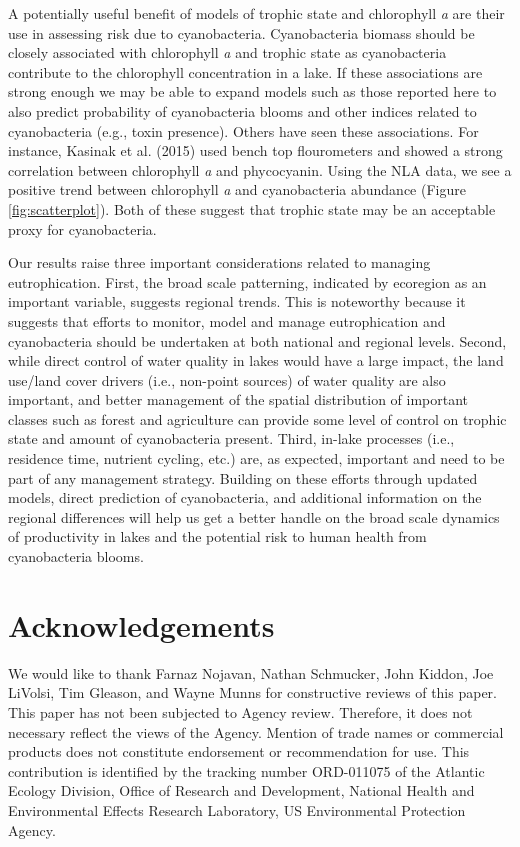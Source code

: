 \documentclass[12pt,]{article}
\begin{document}
A potentially useful benefit of models of trophic state and chlorophyll
\emph{a} are their use in assessing risk due to cyanobacteria.
Cyanobacteria biomass should be closely associated with chlorophyll
\emph{a} and trophic state as cyanobacteria contribute to the
chlorophyll concentration in a lake. If these associations are strong
enough we may be able to expand models such as those reported here to
also predict probability of cyanobacteria blooms and other indices
related to cyanobacteria (e.g., toxin presence). Others have seen these
associations. For instance, Kasinak et al. (2015) used bench top
flourometers and showed a strong correlation between chlorophyll
\emph{a} and phycocyanin. Using the NLA data, we see a positive trend
between chlorophyll \emph{a} and cyanobacteria abundance (Figure
\ref{fig:scatterplot}). Both of these suggest that trophic state may be
an acceptable proxy for cyanobacteria.

Our results raise three important considerations related to managing
eutrophication. First, the broad scale patterning, indicated by
ecoregion as an important variable, suggests regional trends. This is
noteworthy because it suggests that efforts to monitor, model and manage
eutrophication and cyanobacteria should be undertaken at both national
and regional levels. Second, while direct control of water quality in
lakes would have a large impact, the land use/land cover drivers (i.e.,
non-point sources) of water quality are also important, and better
management of the spatial distribution of important classes such as
forest and agriculture can provide some level of control on trophic
state and amount of cyanobacteria present. Third, in-lake processes
(i.e., residence time, nutrient cycling, etc.) are, as expected,
important and need to be part of any management strategy. Building on
these efforts through updated models, direct prediction of
cyanobacteria, and additional information on the regional differences
will help us get a better handle on the broad scale dynamics of
productivity in lakes and the potential risk to human health from
cyanobacteria blooms.

\section{Acknowledgements}\label{acknowledgements}

We would like to thank Farnaz Nojavan, Nathan Schmucker, John Kiddon,
Joe LiVolsi, Tim Gleason, and Wayne Munns for constructive reviews of
this paper. This paper has not been subjected to Agency review.
Therefore, it does not necessary reflect the views of the Agency.
Mention of trade names or commercial products does not constitute
endorsement or recommendation for use. This contribution is identified
by the tracking number ORD-011075 of the Atlantic Ecology Division,
Office of Research and Development, National Health and Environmental
Effects Research Laboratory, US Environmental Protection Agency.
\end{document}
